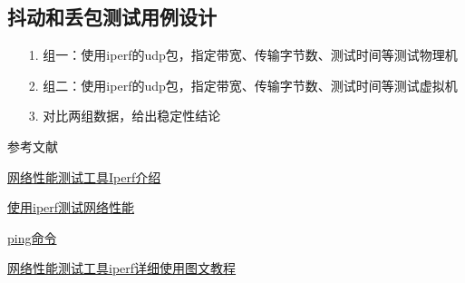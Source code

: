 \documentclass[a4paper,left=1.5cm,right=1.5cm,11pt]{article}
\def\hang{\hangindent\parindent}
\def\textindent#1{\indent\llap{#1\enspace}\ignorespaces}
\def\re{\par\hang\textindent}
\begin{document}
\subsection{抖动和丢包测试用例设计}
\begin{itemize}
	\item[1.]组一：使用iperf的udp包，指定带宽、传输字节数、测试时间等测试物理机
	\item[2.]组二：使用iperf的udp包，指定带宽、传输字节数、测试时间等测试虚拟机
	\item[3.]对比两组数据，给出稳定性结论
\end{itemize}
\clearpage
\begin{center}%
参考文献
\end{center}
\re{[1]} \href{http://www.sdnlab.com/2961.html}{网络性能测试工具Iperf介绍} 
\re{[2]} \href{http://www.51testing.com/html/11/255511-805117.html}{使用iperf测试网络性能}
\re{[3]} \href{http://cn.linux.vbird.org/linux_server/0140networkcommand/0140networkcommand-centos4.php#ping}{ping命令}
\re{[4]} \href{http://www.cnblogs.com/legendbaby/p/5056923.html}{网络性能测试工具iperf详细使用图文教程} 
\end{document}
